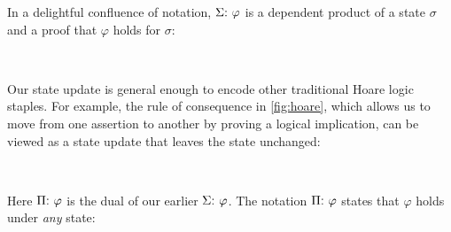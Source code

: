 \documentclass[sigplan]{acmart}%
\begin{document}
In a delightful confluence of notation, $\AgdaFunction{\ensuremath{\Sigma}:}\ \varphi$
is a dependent product of a state $\sigma$ and a proof that $\varphi$ holds for $\sigma$: 
\begin{code}
\>[2]\AgdaSpace{}%
\AgdaSymbol{:}\AgdaSpace{}%
\AgdaSpace{}%
\AgdaSpace{}%
\<%
\\
%
\>[2]\AgdaSpace{}%
\AgdaSpace{}%
\AgdaSymbol{=}\AgdaSpace{}%
\AgdaSpace{}%
\AgdaSpace{}%
\AgdaSpace{}%
\AgdaSpace{}%
\AgdaSpace{}%
\AgdaSpace{}%
\AgdaSpace{}%
\AgdaSpace{}%
\<%
\end{code}
Our state update is general enough to encode other traditional Hoare logic staples.
For example, the rule of consequence in \autoref{fig:hoare}, which allows us to move from one assertion 
to another by proving a logical implication, can be viewed as a state update that leaves 
the state unchanged:
\begin{code}
\>[2]\AgdaSpace{}%
\AgdaSymbol{:}\AgdaSpace{}%
\AgdaSpace{}%
\AgdaSymbol{(}\AgdaSpace{}%
\AgdaSpace{}%
\AgdaSymbol{)}\AgdaSpace{}%
\AgdaSpace{}%
\AgdaOperator{\AgdaDatatype{[}}\AgdaSpace{}%
\AgdaSpace{}%
\AgdaOperator{\AgdaDatatype{,}}\AgdaSpace{}%
\AgdaSpace{}%
\AgdaOperator{\AgdaDatatype{]}}\<%
\\
%
\>[2]\AgdaSpace{}%
\AgdaSpace{}%
\AgdaSymbol{=}\AgdaSpace{}%
\AgdaSpace{}%
\AgdaSpace{}%
\AgdaSymbol{\{}\AgdaSpace{}%
\AgdaSymbol{(}\AgdaSpace{}%
\AgdaSpace{}%
\AgdaOperator{\AgdaInductiveConstructor{,}}\AgdaSpace{}%
\AgdaSpace{}%
\AgdaSymbol{)}\AgdaSpace{}%
\AgdaSpace{}%
\AgdaSpace{}%
\AgdaOperator{\AgdaInductiveConstructor{,}}\AgdaSpace{}%
\AgdaSymbol{(}\AgdaSpace{}%
\AgdaSpace{}%
\AgdaSpace{}%
\AgdaSpace{}%
\AgdaSymbol{)}\AgdaSpace{}%
\AgdaSymbol{\}}\<%
\end{code}
Here $\AgdaFunction{\ensuremath{\Pi}:}\ \varphi$ is the dual of our earlier $\AgdaFunction{\ensuremath{\Sigma}:}\ \varphi$.
The notation $\AgdaFunction{\ensuremath{\Pi}:}\ \varphi$ states that $\varphi$ holds under \emph{any} state:
\end{document}
